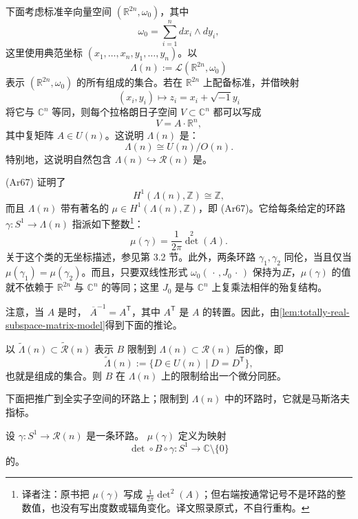 下面考虑标准辛向量空间 $(\mathbb R^{2n},\omega_0)$，其中
\[
  \omega_0=\sum_{i=1}^n dx_i\wedge dy_i,
\]
这里使用典范坐标 $(x_1,\ldots,x_n,y_1,\ldots,y_n)$。以
\[
  \Lambda(n):=\mathcal L(\mathbb R^{2n},\omega_0)
\]
表示 $(\mathbb R^{2n},\omega_0)$ 的所有\termLagrangianSubspace{}组成的集合。若在 $\mathbb R^{2n}$ 上配备标准\termComplexMultiplication{}，并借映射
\[
  (x_i,y_i)\longmapsto z_i=x_i+\sqrt{-1}y_i
\]
将它与 $\mathbb C^n$ 等同，则每个拉格朗日子空间
$V\subset\mathbb C^n$ 都可以写成
\[
  V=A\cdot\mathbb R^n,
\]
其中复矩阵 $A\in U(n)$。这说明 $\Lambda(n)$ 是\termHomogeneousSpace{}：
\[
  \Lambda(n)\cong U(n)/O(n).
\]
特别地，这说明自然包含 $\Lambda(n)\hookrightarrow\mathcal R(n)$ 是\termHomotopyEquivalence{}。

(Ar67) 证明了
\[
  H^1(\Lambda(n),\mathbb Z)\cong\mathbb Z,
\]
而且 $\Lambda(n)$ 带有著名的\termCharacteristicClass{}
$\mu\in H^1(\Lambda(n),\mathbb Z)$，即\emph{\termMaslovClass{}} (Ar67)。它给每条给定的环路
$\gamma:S^1\to\Lambda(n)$ 指派如下整数\footnote{译者注：原书把 $\mu(\gamma)$ 写成 $\frac{1}{2\pi}\det^2(A)$；但右端按通常记号不是环路的整数值，也没有写出度数或辐角变化。译文照录原式，不自行重构。}：
\[
  \mu(\gamma)=\frac{1}{2\pi}\det^2(A).
\]
关于这个类的无坐标描述，参见第 3.2 节。此外，两条环路
$\gamma_1,\gamma_2$ 同伦，当且仅当
$\mu(\gamma_1)=\mu(\gamma_2)$。而且，只要双线性形式
$\omega_0(\,\cdot\,,J_0\,\cdot\,)$ 保持为\emph{正}，$\mu(\gamma)$ 的值就不依赖于 $\mathbb R^{2n}$ 与 $\mathbb C^n$ 的等同；这里 $J_0$ 是与 $\mathbb C^n$ 上复乘法相伴的殆复结构。

注意，当 $A$ 是\termUnitaryMatrix{}时，
$\overline A^{-1}=A^{\mathsf T}$，其中 $A^{\mathsf T}$ 是 $A$ 的转置。因此，由\cref{lem:totally-real-subspace-matrix-model}得到下面的推论。

\begin{corollary}
\label{cor:symmetric-unitary-model-lagrangian-grassmannian}
以 $\widetilde\Lambda(n)\subset\widetilde{\mathcal R}(n)$ 表示 $B$ 限制到
$\Lambda(n)\subset\mathcal R(n)$ 后的像，即
\begin{equation}
  \widetilde\Lambda(n)
  :=\{D\in U(n)\mid D=D^{\mathsf T}\},
\label{eq:symmetric-unitary-matrices}
\end{equation}
也就是\termSymmetricUnitaryMatrix{}组成的集合。则 $B$ 在 $\Lambda(n)$ 上的限制给出一个微分同胚。
\end{corollary}

下面把\termMaslovIndex{}推广到全实子空间的环路上；限制到
$\Lambda(n)$ 中的环路时，它就是马斯洛夫指标。

\begin{definition}[广义马斯洛夫指标]
\label{def:generalized-maslov-index}
设 $\gamma:S^1\to\mathcal R(n)$ 是一条环路。\termGeneralizedMaslovIndex{}
$\mu(\gamma)$ 定义为映射
\[
  \det\circ B\circ\gamma:S^1\longrightarrow\mathbb C\setminus\{0\}
\]
的\termWindingNumber{}。
\end{definition}
